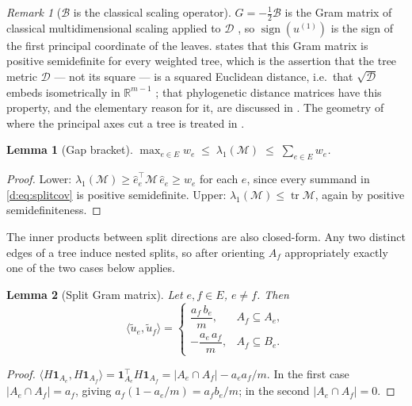 \documentclass[11pt]{article}
\theoremstyle{plain}
\newtheorem{lemma}{Lemma}
\theoremstyle{definition}
\theoremstyle{remark}
\newtheorem{remark}{Remark}
\providecommand{\Dmat}{\mathcal{D}}          %
\providecommand{\Bop}{\mathcal{B}}           %
\providecommand{\Mop}{\mathcal{M}}           %
\providecommand{\uone}{u^{(1)}}
\providecommand{\1}{\mathbf{1}}
\providecommand{\R}{\mathbb{R}}
\newcommand{\ehat}{\hat{e}}
\begin{document}
\begin{remark}[$\Bop$ is the classical scaling operator]\label{d:rem:mds}
$G=-\tfrac12\Bop$ is the Gram matrix of classical multidimensional scaling
applied to $\Dmat$ \cite{young1938discussion,torgerson1952mds,gower1966distance},
so $\operatorname{sign}(\uone)$ is the sign of the first principal coordinate of
the leaves.  states that this Gram matrix is positive
semidefinite for every weighted tree, which is the assertion that the tree metric
$\Dmat$ --- not its square --- is a squared Euclidean distance, i.e.\ that
$\sqrt{\Dmat}$ embeds isometrically in $\R^{m-1}$
\cite{schoenberg1935remarks,gower1985properties}; that phylogenetic distance
matrices have this property, and the elementary reason for it, are discussed in
\cite{devienne2011euclidean,layer2017embeddings}. The geometry of where the
principal axes cut a tree is treated in \cite{fiedler2005euclidean}.
\end{remark}

\begin{lemma}[Gap bracket]\label{d:lem:bracket}
$\displaystyle \max_{e\in E}w_e\;\le\;\lambda_1(\Mop)\;\le\;\sum_{e\in E}w_e$.
\end{lemma}

\begin{proof}
Lower: $\lambda_1(\Mop)\ge\ehat_e^\top\Mop\,\ehat_e\ge w_e$ for each $e$, since
every summand in \eqref{d:eq:splitcov} is positive semidefinite. Upper:
$\lambda_1(\Mop)\le\operatorname{tr}\Mop$, again by positive semidefiniteness.
\end{proof}

The inner products between split directions are also closed-form. Any two
distinct edges of a tree induce nested splits, so after orienting $A_f$
appropriately exactly one of the two cases below applies.

\begin{lemma}[Split Gram matrix]\label{d:lem:gram}
Let $e,f\in E$, $e\ne f$. Then
\begin{equation}\label{d:eq:gram}
  \langle\tilde u_e,\tilde u_f\rangle=
  \begin{cases}
    \dfrac{a_f\,b_e}{m}, & A_f\subseteq A_e,\\[2mm]
    -\dfrac{a_e\,a_f}{m}, & A_f\subseteq B_e .
  \end{cases}
\end{equation}
\end{lemma}

\begin{proof}
$\langle H\1_{A_e},H\1_{A_f}\rangle=\1_{A_e}^\top H\1_{A_f}
 =|A_e\cap A_f|-a_ea_f/m$. In the first case $|A_e\cap A_f|=a_f$, giving
$a_f(1-a_e/m)=a_fb_e/m$; in the second $|A_e\cap A_f|=0$.
\end{proof}
\end{document}
